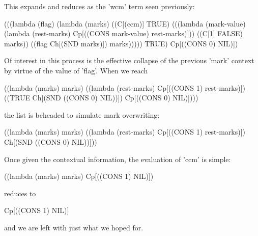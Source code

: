 This expands and reduces as the \scheme'wcm' term seen previously:
\begin{schemeblock}
\begin{schemedisplay}
(((lambda (flag)
    (lambda (marks)
      ((C[(ccm)] TRUE)
       (((lambda (mark-value) (lambda (rest-marks) Cp[((CONS mark-value) rest-marks)]))
         ((C[1] FALSE) marks))
        ((flag Ch[(SND marks)]) marks)))))
  TRUE) Cp[((CONS 0) NIL)])
\end{schemedisplay}
\end{schemeblock}

Of interest in this process is the effective collapse of the previous \scheme'mark' context by virtue of the value of \scheme'flag'. When we reach
\begin{schemeblock}
\begin{schemedisplay}
((lambda (marks) marks)
 ((lambda (rest-marks) Cp[((CONS 1) rest-marks)])
  ((TRUE Ch[(SND ((CONS 0) NIL))]) Cp[((CONS 0) NIL)])))
\end{schemedisplay}
\end{schemeblock}
\noindent
the list is beheaded to simulate mark overwriting:
\begin{schemeblock}
\begin{schemedisplay}
((lambda (marks) marks)
 ((lambda (rest-marks) Cp[((CONS 1) rest-marks)])
  Ch[(SND ((CONS 0) NIL))]))
\end{schemedisplay}
\end{schemeblock}

Once given the contextual information, the evaluation of \scheme'ccm' is simple:
\begin{schemeblock}
\begin{schemedisplay}
((lambda (marks) marks)
 Cp[((CONS 1) NIL)])
\end{schemedisplay}
\end{schemeblock}
\noindent
reduces to
\begin{schemeblock}
\begin{schemedisplay}
Cp[((CONS 1) NIL)]
\end{schemedisplay}
\end{schemeblock}
\noindent
and we are left with just what we hoped for.



